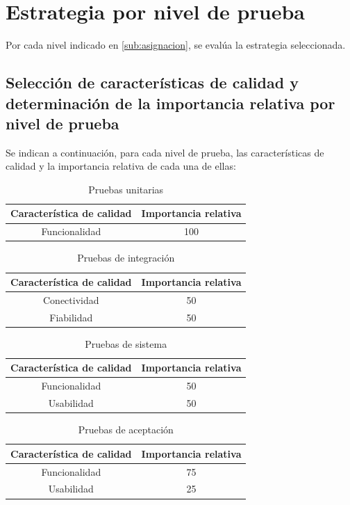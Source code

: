 \documentclass[
    11pt,
    spanish,
	a4paper
]{article}
\begin{document}
\section{Estrategia por nivel de prueba}
\label{sec:estrategia}

Por cada nivel indicado en \ref{sub:asignacion}, se evalúa la estrategia seleccionada.

\subsection{Selección de características de calidad y determinación de la importancia relativa por nivel de prueba}
\label{sub:importanciaRelativa}

Se indican a continuación, para cada nivel de prueba, las características de calidad y la importancia relativa de cada una de ellas:

\begin{table}[H]
\centering
\caption{Pruebas unitarias}
\begin{tabular}{c|c}
    Característica de calidad & Importancia relativa \\ \hline
    Funcionalidad & 100 \\
\end{tabular}
\end{table}


\begin{table}[H]
\centering
\caption{Pruebas de integración}
\begin{tabular}{c|c}
    Característica de calidad & Importancia relativa \\ \hline
    Conectividad & 50 \\
    Fiabilidad   & 50 \\
\end{tabular}
\end{table}

\begin{table}[H]
\centering
\caption{Pruebas de sistema}
\begin{tabular}{c|c}
    Característica de calidad & Importancia relativa \\ \hline
    Funcionalidad & 50 \\
    Usabilidad    & 50 \\
\end{tabular}
\end{table}

\begin{table}[H]
\centering
\caption{Pruebas de aceptación}
\begin{tabular}{c|c}
    Característica de calidad & Importancia relativa \\ \hline
    Funcionalidad & 75 \\
    Usabilidad    & 25 \\
\end{tabular}
\end{table}
\end{document}
